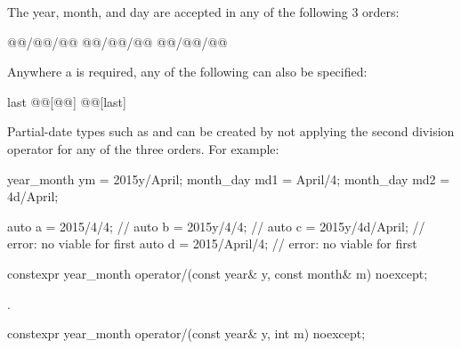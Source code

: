 \pnum
\begin{note}
The year, month, and day are accepted in any of the following 3 orders:
\begin{codeblock}
@@/@@/@@
@@/@@/@@
@@/@@/@@
\end{codeblock}

Anywhere a  is required, any of the following can also be specified:
\begin{codeblock}
last
@@[@@]
@@[last]
\end{codeblock}
\end{note}

\pnum
\begin{note}
Partial-date types such as  and 
can be created by not applying the second division operator
for any of the three orders. For example:
\begin{codeblock}
year_month ym = 2015y/April;
month_day md1 = April/4;
month_day md2 = 4d/April;
\end{codeblock}
\end{note}

\pnum
\begin{example}
\begin{codeblock}
auto a = 2015/4/4;          // 
auto b = 2015y/4/4;         // 
auto c = 2015y/4d/April;    // error: no viable  for first \tcode{/}
auto d = 2015/April/4;      // error: no viable  for first \tcode{/}
\end{codeblock}
\end{example}

\begin{itemdecl}
constexpr year_month
  operator/(const year& y, const month& m) noexcept;
\end{itemdecl}

\begin{itemdescr}
\pnum
\returns
{}.
\end{itemdescr}

\begin{itemdecl}
constexpr year_month
  operator/(const year& y, int   m) noexcept;
\end{itemdecl}

